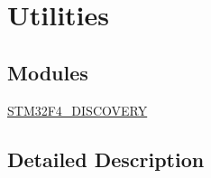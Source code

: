 \hypertarget{group___utilities}{}\section{Utilities}
\label{group___utilities}
\subsection*{Modules}
\begin{DoxyCompactItemize}
\item 
\hyperlink{group___s_t_m32_f4___d_i_s_c_o_v_e_r_y}{S\+T\+M32\+F4\+\_\+\+D\+I\+S\+C\+O\+V\+E\+R\+Y}
\end{DoxyCompactItemize}


\subsection{Detailed Description}
